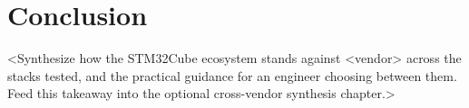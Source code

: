 
\section*{Conclusion}
<Synthesize how the STM32Cube ecosystem stands against <vendor> across the
stacks tested, and the practical guidance for an engineer choosing between
them. Feed this takeaway into the optional cross-vendor synthesis chapter.>
